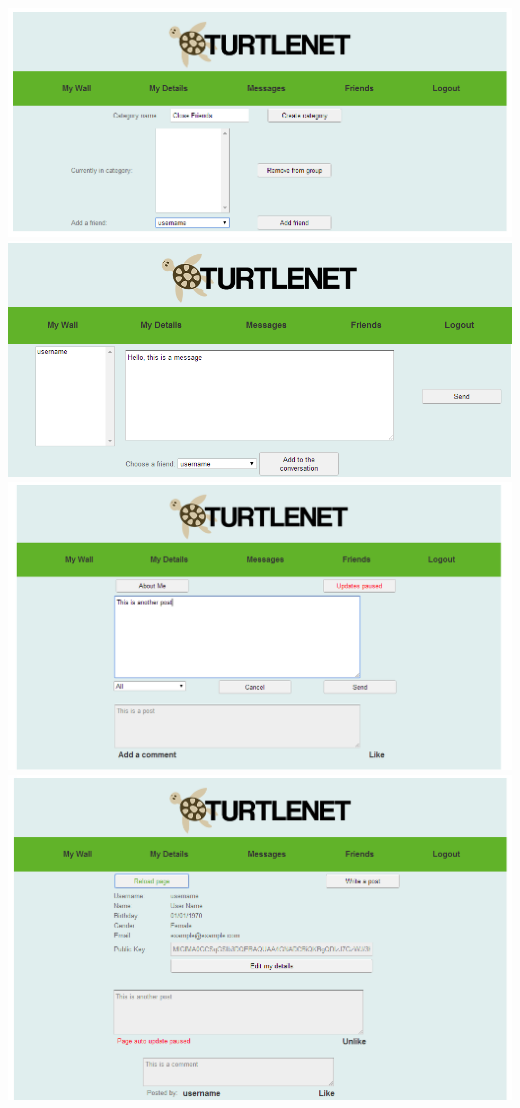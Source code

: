 \includegraphics[scale=0.2]{images/screenshots/crop1.png}
\includegraphics[scale=0.2]{images/screenshots/crop2.png}
\includegraphics[scale=0.2]{images/screenshots/crop3.png}
\includegraphics[scale=0.2]{images/screenshots/crop4.png}
